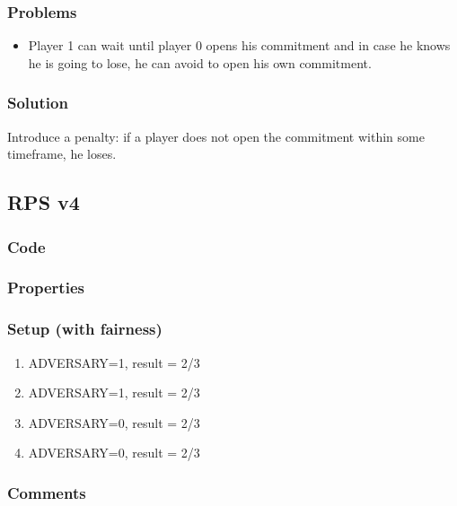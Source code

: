 \documentclass{article}
\begin{document}
\subsubsection{Problems}

\begin{itemize}
\item Player 1 can wait until player 0 opens his commitment and in case he knows he is going to lose, he can 
avoid to open his own commitment.
\end{itemize}

\subsubsection{Solution}
Introduce a penalty: if a player does not open the commitment within some timeframe, he loses.

\subsection{RPS v4}

\subsubsection{Code}



\subsubsection{Properties}



\subsubsection{Setup (with fairness)}

\begin{enumerate}
\item ADVERSARY=1, result = 2/3
\item ADVERSARY=1, result = 2/3
\item ADVERSARY=0, result = 2/3
\item ADVERSARY=0, result = 2/3
\end{enumerate}

\subsubsection{Comments}
\end{document}
